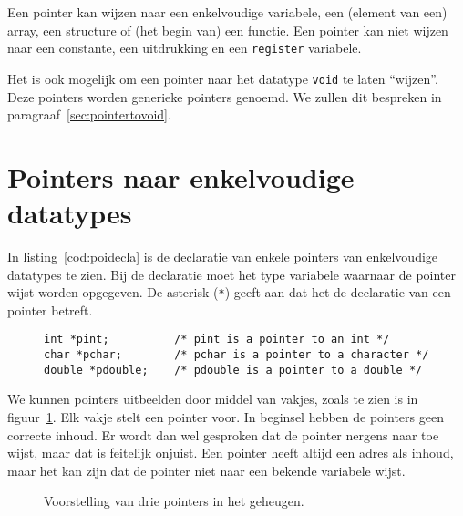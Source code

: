 Een pointer kan wijzen naar een enkelvoudige variabele, een (element van een) array, een structure of (het begin van) een functie. Een pointer kan niet wijzen naar een constante, een uitdrukking en een \texttt{register} variabele.

Het is ook mogelijk om een pointer naar het datatype \texttt{void} te laten ``wijzen''.
Deze pointers worden generieke pointers genoemd. We zullen dit bespreken in paragraaf~\ref{sec:pointertovoid}.

\section{Pointers naar enkelvoudige datatypes}
\label{sec:pointersnaarenkelvoudigedatatypes}
In listing~\ref{cod:poidecla} is de declaratie van enkele pointers van enkelvoudige datatypes te zien. Bij de declaratie moet het type variabele waarnaar de pointer wijst worden opgegeven. De asterisk (\texttt{*}) geeft aan dat het de declaratie van een pointer betreft.

\begin{figure}[!ht]
\begin{lstlisting}[caption=Enkele declaraties van pointers.,label=cod:poidecla]
int *pint;          /* pint is a pointer to an int */
char *pchar;        /* pchar is a pointer to a character */
double *pdouble;    /* pdouble is a pointer to a double */
\end{lstlisting}
\end{figure}

We kunnen pointers uitbeelden door middel van vakjes, zoals te zien is in figuur~\ref{fig:poivoorstelling1}. Elk vakje stelt een pointer voor. In beginsel hebben de pointers geen correcte inhoud. Er wordt dan wel gesproken dat de pointer nergens naar toe wijst, maar dat is feitelijk onjuist. Een pointer heeft altijd een adres als inhoud, maar het kan zijn dat de pointer niet naar een bekende variabele wijst.

\begin{figure}[!ht]
\centering
{}
\caption{Voorstelling van drie pointers in het geheugen.}
\label{fig:poivoorstelling1}
\end{figure}

